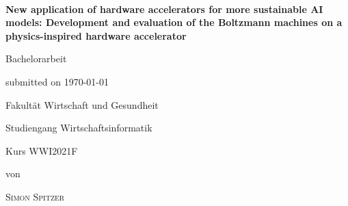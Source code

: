 \newcommand{\typMeinerArbeit}{Bachelorarbeit} 

\newcommand{\themaMeinerArbeit}{Mein Titel}

\newcommand{\meinName}{Simon Spitzer}

\thispagestyle{empty}

\begin{spacing}{1}
\begin{center}	
~\vspace{0mm}

{\sffamily
\LARGE  
\textbf{New application of hardware accelerators
for more sustainable AI models: Development and
evaluation of the Boltzmann machines on a
physics-inspired hardware accelerator}

\bigskip
\textbf{}
}


\vspace{15mm}

{\Large \typMeinerArbeit}

\vspace{1cm}

submitted on \today 

\vspace{15mm}

Fakultät Wirtschaft und Gesundheit
\medskip

Studiengang Wirtschaftsinformatik
\medskip

Kurs WWI2021F

\vspace{10mm}

von

\vspace{10mm}

{\large\textsc{\meinName}}

\vspace{10mm}
\end{center}


\end{spacing}
